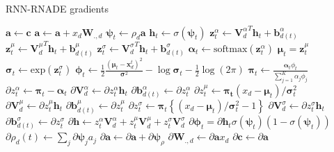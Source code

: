 \documentclass{article} %
\begin{document}
\begin{algorithm}
\caption{RNN-RNADE gradients}
\begin{algorithmic}%
\State $\mathbf{a} \gets \mathbf{c}$
	\State $\mathbf{a} \gets \mathbf{a} + x_{d}\mathbf{W}_{.,d} $
\EndFor
{}
\State $\boldsymbol{\psi}_{t} \gets \rho_{d} \mathbf a$
\State $\mathbf{h}_{t} \gets \sigma(\boldsymbol{\psi}_t)$
\State $\mathbf{z}^{\alpha}_{t} \gets {\mathbf{V}^{\alpha}_{d}}^{T}\mathbf{h}_t + \mathbf{b}^{\alpha}_{d(t)} $
\State $\mathbf{z}^{\mu}_{t} \gets {\mathbf{V}^{\mu}_{d}}^{T}\mathbf{h}_t + \mathbf{b}^{\mu}_{d(t)} $
\State $\mathbf{z}^{\sigma}_{t} \gets {\mathbf{V}^{\sigma}_{d}}^{T}\mathbf{h}_t + \mathbf{b}^{\sigma}_{d(t)} $
\State $\boldsymbol{\alpha}_{t} \gets \text{softmax}(\mathbf{z}^{\alpha}_t)$
\State $\boldsymbol{\mu}_{t} = \mathbf{z}^{\mu}_t$
\State $\boldsymbol{\sigma}_{t} \gets \text{exp}(\mathbf{z}^{\sigma}_t)$
\State $\boldsymbol{\phi}_{t} \gets \frac{1}{2} \frac{(\boldsymbol{\mu}_t-\mathbf{x}^{t}_d)^2}{\boldsymbol{\sigma}^2} - \log \boldsymbol{\sigma}_t - \frac{1}{2}\log(2\pi)$
\State $\boldsymbol{\pi}_{t} \gets \frac{\boldsymbol{\alpha}_t\phi_t}{\sum_{j=1}^{K} \alpha_j \phi_j}$
\State $\partial z^{\alpha}_{t} \gets \boldsymbol{\pi}_t - \boldsymbol{\alpha}_t$
\State $\partial \boldsymbol{V}^{\alpha}_{d} \gets \partial z^{\alpha}_t \mathbf{h}_t$
\State $\partial \mathbf{b}^{\alpha}_{d(t)} \gets \partial z^{\alpha}_t$
\State $\partial z^{\mu}_{t} \gets \boldsymbol{\pi_t}(x_d - \boldsymbol{\mu}_t)/\boldsymbol{\sigma}_t^2$
\State $\partial \boldsymbol{V}^{\mu}_{d} \gets \partial z^{\mu}_t \mathbf{h}_t$
\State $\partial \mathbf{b}^{\mu}_{d(t)} \gets \partial z^{\mu}_t$
\State $\partial z^{\sigma}_t \gets \boldsymbol{\pi}_t\left\{ (x_d - \boldsymbol{\mu}_t)/\boldsymbol{\sigma}^2_t -1\right\}$
\State $\partial \boldsymbol{V}^{\sigma}_{d} \gets \partial z^{\sigma}_t \mathbf{h}_t$
\State $\partial \mathbf{b}^{\sigma}_{d(t)} \gets \partial z^{\sigma}_t$
\State $\partial \mathbf{h} \gets z^{\alpha}_t\boldsymbol{V}^{\alpha}_{d} + z^{\mu}_t\boldsymbol{V}^{\mu}_{d} + z^{\sigma}_t\boldsymbol{V}^{\sigma}_{d}$
\State $\partial \boldsymbol{\phi}_t = \partial \mathbf{h}_t\sigma(\boldsymbol{\psi}_t)(1-\sigma(\boldsymbol{\psi}_t))$
\State $\partial \rho_d(t) \gets \sum_{j} \partial \boldsymbol{\psi}_ja_j$
\State $\partial \mathbf{a} \gets \partial \mathbf{a} + \partial \boldsymbol{\psi}_{\rho}$
\State $\partial \mathbf{W}_{.,d} \gets \partial \mathbf{a}x_d$
	\State $\partial \mathbf{c} \gets \partial \mathbf{a}$

\end{algorithmic}
\end{algorithm}
\end{document}
